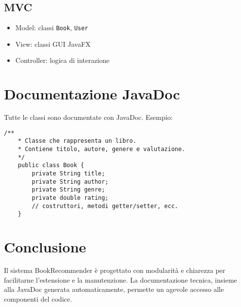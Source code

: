 \documentclass[a4paper,12pt]{article}
\begin{document}
    \subsection{MVC}
    \begin{itemize}
    \item Model: classi \texttt{Book}, \texttt{User}
    \item View: classi GUI JavaFX
    \item Controller: logica di interazione
    \end{itemize}

    \section{Documentazione JavaDoc}
    Tutte le classi sono documentate con JavaDoc. Esempio:
    \begin{lstlisting}[caption={JavaDoc per classe Book}]
    /**
    * Classe che rappresenta un libro.
    * Contiene titolo, autore, genere e valutazione.
    */
    public class Book {
        private String title;
        private String author;
        private String genre;
        private double rating;
        // costruttori, metodi getter/setter, ecc.
    }
    \end{lstlisting}

    \section{Conclusione}
    Il sistema BookRecommender è progettato con modularità e chiarezza per facilitarne l’estensione e la manutenzione. La documentazione tecnica, insieme alla JavaDoc generata automaticamente, permette un agevole accesso alle componenti del codice.
\end{document}
